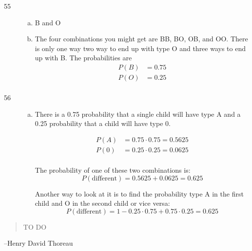 \documentclass[letterpaper, landscape]{exam}
\begin{document}
\begin{description}
    \item[55]
      \begin{enumerate}[(a)]
        \item B and O

        \item
          The four combinations you might get are BB, BO, OB, and OO. There is
          only one way two way to end up with type O and three ways to end up
          with B. The probabilities are
          \begin{align*}
            P(B) & = 0.75 \\
            P(O) & = 0.25 \\
          \end{align*}
      \end{enumerate}

    \item[56]
      \begin{enumerate}[(a)]
        \item There is a 0.75 probability that a single child will have type A and a
          0.25 probability that a child will have type 0. 

          \begin{align*}
            P(A) &= 0.75 \cdot 0.75 = 0.5625 \\
            P(0) &= 0.25 \cdot 0.25 = 0.0625 \\
          \end{align*}

          The probability of one of these two combinations is:
          \[
            P(\text{different}) = 0.5625 + 0.0625 = \boxed{ 0.625 }
          \]

          Another way to look at it is to find the probability type A in the
          first child and O in the second child or vice versa:
          \[
            P(\text{different}) = 1 - 0.25 \cdot 0.75 + 0.75 \cdot 0.25 
              = \boxed{ 0.625 }
          \]
      \end{enumerate}
  \end{description}

  \else
    \vspace{10 cm}
    \begin{quote}
      \begin{em}
        TO DO
      \end{em}
    \end{quote}
    \hspace{1 cm} --Henry David Thoreau
  \fi
\end{document}
